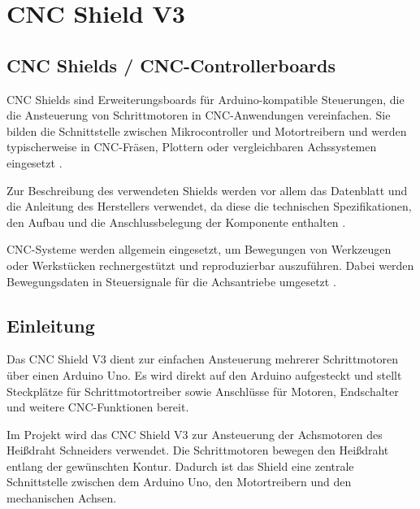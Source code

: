 %
%

\chapter{CNC Shield V3}

\section{CNC Shields / CNC-Controllerboards}

CNC Shields sind Erweiterungsboards für Arduino-kompatible Steuerungen, die die Ansteuerung von Schrittmotoren in CNC-Anwendungen vereinfachen. Sie bilden die Schnittstelle zwischen Mikrocontroller und Motortreibern und werden typischerweise in CNC-Fräsen, Plottern oder vergleichbaren Achssystemen eingesetzt \cite{JoyIT:CNCShield:Datenblatt}.

Zur Beschreibung des verwendeten Shields werden vor allem das Datenblatt und die Anleitung des Herstellers verwendet, da diese die technischen Spezifikationen, den Aufbau und die Anschlussbelegung der Komponente enthalten \cite{JoyIT:CNCShield:Datenblatt}\cite{JoyIT:CNCShield:Anleitung}.

CNC-Systeme werden allgemein eingesetzt, um Bewegungen von Werkzeugen oder Werkstücken rechnergestützt und reproduzierbar auszuführen. Dabei werden Bewegungsdaten in Steuersignale für die Achsantriebe umgesetzt \cite{Hehenberger:2020}.

\section{Einleitung}

Das CNC Shield V3 dient zur einfachen Ansteuerung mehrerer Schrittmotoren über einen Arduino Uno. Es wird direkt auf den Arduino aufgesteckt und stellt Steckplätze für Schrittmotortreiber sowie Anschlüsse für Motoren, Endschalter und weitere CNC-Funktionen bereit.

Im Projekt wird das CNC Shield V3 zur Ansteuerung der Achsmotoren des Heißdraht Schneiders verwendet. Die Schrittmotoren bewegen den Heißdraht entlang der gewünschten Kontur. Dadurch ist das Shield eine zentrale Schnittstelle zwischen dem Arduino Uno, den Motortreibern und den mechanischen Achsen.

